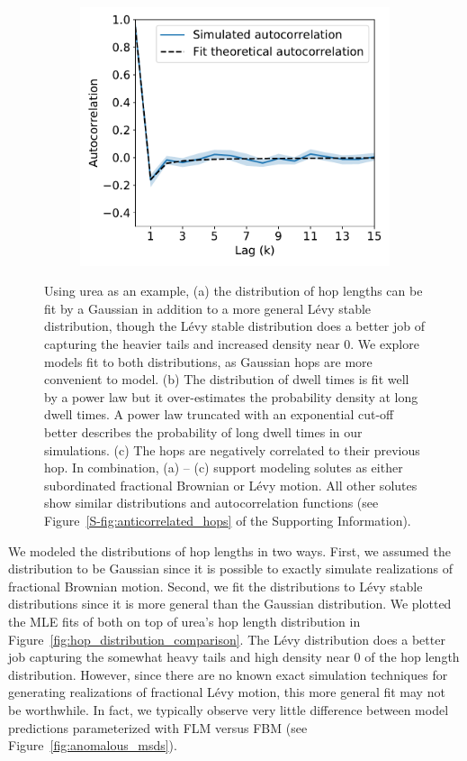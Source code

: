 \documentclass[journal=jctcce,manuscript=article]{achemso}
\begin{document}
\begin{figure}
\begin{subfigure}{0.325\textwidth}
  \includegraphics[width=\textwidth]{URE_hop_acf.pdf}
  \caption{}\label{fig:hop_acf}
  \end{subfigure}
  \caption{Using urea as an example, (a) the distribution of hop lengths can be
	  fit by a Gaussian in addition to a more general L\'evy stable
	  distribution, though the L\'evy stable distribution does a better job of
	  capturing the heavier tails and increased density near 0. We explore
	  models fit to both distributions, as Gaussian hops are more convenient
	  to model. (b) The distribution of dwell times is fit well by a power
	  law but it over-estimates the probability density at long dwell
	  times. A power law truncated with an exponential cut-off better
	  describes the probability of long dwell times in our simulations. (c)
	  The hops are negatively correlated to their previous hop. In
	  combination, (a) -- (c) support modeling solutes as either
	  subordinated fractional Brownian or L\'evy motion. All other solutes
	  show similar distributions and autocorrelation functions (see
	  Figure~\ref{S-fig:anticorrelated_hops} of the Supporting Information).
  }\label{fig:anticorrelated_hops}
  \end{figure}
  
  We modeled the distributions of hop lengths in two ways. First, we assumed
  the distribution to be Gaussian since it is possible to exactly simulate
  realizations of fractional Brownian motion. Second, we fit the distributions
  to L\'evy stable distributions since it is more general than the Gaussian
  distribution. We plotted the MLE fits of both on top of urea's hop length
  distribution in Figure~\ref{fig:hop_distribution_comparison}. The L\'evy
  distribution does a better job capturing the somewhat heavy tails and high
  density near 0 of the hop length distribution. However, since there are no
  known exact simulation techniques for generating realizations of fractional
  L\'evy motion, this more general fit may not be worthwhile. In fact, we
  typically observe very little difference between model predictions
  parameterized with FLM versus FBM (see Figure~\ref{fig:anomalous_msds}).
\end{document}
